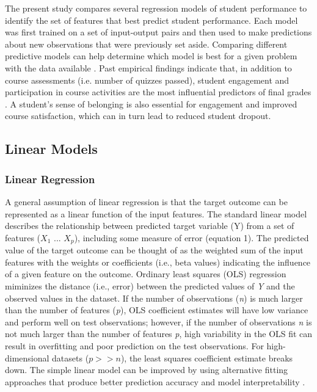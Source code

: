 \documentclass[sigconf]{acmart}
\begin{document}

The present study compares several regression models of student performance 
to identify the set of features that best predict student performance. Each 
model was first trained on a set of input-output pairs and then used 
to make predictions about new observations that were previously set aside. 
Comparing different predictive models can help determine which model is best
for a given problem with the data available \cite{raschka17}. Past empirical 
findings indicate that, in addition to course assessments (i.e. number of
quizzes passed), student engagement and participation in course activities 
are the most influential predictors of final grades 
\cite{papamitsiou14, romero10}. A student's sense of belonging is also 
essential for engagement and improved course satisfaction, which can in 
turn lead to reduced student dropout. 

\subsection{Linear Models} 

\subsubsection{Linear Regression} 
A general assumption of linear regression is that the target outcome can be 
represented as a linear function of the input features. The standard linear 
model describes the relationship between predicted target variable 
(Y) from a set of features ($X_1$ ... $X_p$), including some measure of error 
(equation 1). The predicted value of the target outcome can be thought of as 
the weighted sum of the input features with the weights or coefficients 
(i.e., beta values) indicating the influence of a given feature on the outcome.
Ordinary least squares (OLS) regression miminizes the distance (i.e., error) 
between the predicted values of \textit{Y} and the observed values in the 
dataset. If the number of observations (\textit{n}) is much larger than the 
number of features (\textit{p}), OLS coefficient estimates will have low 
variance and perform well on test observations; however, if the number of 
observations \textit{n} is not much larger than the number of features 
\textit{p}, high variability in the OLS fit can result in overfitting and 
poor prediction on the test observations. For high-dimensional datasets 
(\textit{$p>>n$}), the least squares coefficient estimate breaks down. The 
simple linear model can be improved by using alternative fitting approaches 
that produce better prediction accuracy and model interpretability 
\cite{jamesetal13}. 
\end{document}
